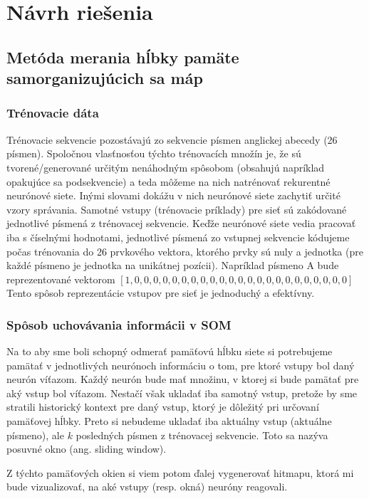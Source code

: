 \chapter{Návrh riešenia}

\section{Metóda merania hĺbky pamäte samorganizujúcich sa máp}

\subsection{Trénovacie dáta}
Trénovacie sekvencie pozostávajú zo sekvencie písmen anglickej abecedy (26 písmen).
Spoločnou vlasťnosťou týchto trénovacích množín je, že sú tvorené/generované určitým nenáhodným spôsobom (obsahujú napríklad opakujúce sa podsekvencie)
a teda môžeme na nich natrénovať rekurentné neurónové siete. Inými slovami dokážu v nich 
neurónové siete zachytiť určité vzory správania.
Samotné vstupy (trénovacie príklady) pre sieť sú zakódované jednotlivé písmená z trénovacej sekvencie.
Keďže neurónové siete vedia pracovať iba s číselnými hodnotami, jednotlivé písmená zo 
vstupnej sekvencie kódujeme počas trénovania do 26 prvkového vektora, 
ktorého prvky sú nuly a jednotka (pre každé písmeno je jednotka na unikátnej pozícii).
Napríklad písmeno A bude reprezentované vektorom
$[1, 0, 0, 0, 0, 0, 0, 0, 0, 0, 0, 0, 0, 0, 0, 0, 0, 0, 0, 0, 0, 0, 0, 0]$
Tento spôsob reprezentácie vstupov pre sieť je jednoduchý a efektívny.

\subsection{Spôsob uchovávania informácii v SOM}
Na to aby sme boli schopný odmerať pamäťovú hĺbku siete si potrebujeme pamätať v jednotlivých
neurónoch informáciu o tom, pre ktoré vstupy bol daný neurón víťazom.
Každý neurón bude mať množinu, v ktorej si bude pamätať pre aký vstup bol víťazom. 
Nestačí však ukladať iba samotný vstup, pretože by sme stratili historický kontext pre daný vstup, 
ktorý je dôležitý pri určovaní pamäťovej hĺbky. 
Preto si nebudeme ukladať iba aktuálny vstup (aktuálne písmeno), 
ale $k$ posledných písmen z trénovacej sekvencie. 
Toto sa nazýva posuvné okno (ang. sliding window). 

Z týchto pamäťových okien si viem potom ďalej vygenerovať hitmapu, 
ktorá mi bude vizualizovať, na aké vstupy (resp. okná) neuróny reagovali.

